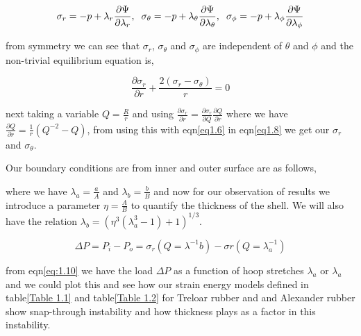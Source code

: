 \documentclass[12pt]{report}
\begin{document}
\begin{flushleft}
\begin{equation}\label{eq1.7}
    \sigma_{r} = -p + \lambda_{r}\frac{\partial\Psi}{\partial\lambda_{r}},\hspace{2mm}\sigma_{\theta} = -p + \lambda_{\theta}\frac{\partial\Psi}{\partial\lambda_{\theta}},\hspace{2mm}\sigma_{\phi} = -p + \lambda_{\phi}\frac{\partial\Psi}{\partial\lambda_{\phi}}
\end{equation}

from symmetry we can see that $\sigma_{r}$, $\sigma_{\theta}$ and $\sigma_{\phi}$ are independent of $\theta$ and $\phi$ and the non-trivial equilibrium equation is,
\vspace{-4mm}

\begin{equation}\label{eq1.8}
    \frac{\partial\sigma_{r}}{\partial r} +\frac{2(\sigma_{r}-\sigma_{\theta})}{r} = 0
\end{equation}

next taking a variable $Q=\frac{R}{r}$ and using $\frac{\partial\sigma_{r}}{\partial r}=\frac{\partial\sigma_{r}}{\partial Q}\frac{\partial Q}{\partial r}$ where we have $\frac{\partial Q}{\partial r} = \frac{1}{r}(Q^{-2}-Q)$, from using this with eqn\ref{eq1.6} in eqn\ref{eq1.8} we get our $\sigma_{r}$ and $\sigma_{\theta}$.

Our boundary conditions are from inner and outer surface are as follows,
\vspace{-4mm}
\begin{equation}\label{eq1.9}
\end{equation}

where we have $\lambda_{a} = \frac{a}{A}$ and $\lambda_{b} = \frac{b}{B}$ and now for our observation of results we introduce a parameter $\eta = \frac{A}{B}$ to quantify the thickness of the shell. We will also have the relation $\lambda_{b} = (\eta^{3}(\lambda_{a}^{3}-1) + 1)^{1/3}$.
\vspace{-4mm}

\begin{equation}\label{eq:1.10}
    \Delta P = P_{i} - P_{o} = \sigma_{r}(Q=\lambda^{-1}{b})-\sigma{r}(Q=\lambda^{-1}_{a})
\end{equation}

from eqn\ref{eq:1.10} we have the load $\Delta P$ as a function of hoop stretches $\lambda_{a}$ or $\lambda_{a}$ and we could plot this and see how our strain energy models defined in table\ref{Table 1.1} and table\ref{Table 1.2} for Treloar\cite{treloar} rubber and and Alexander\cite{alexander} rubber show snap-through instability and how thickness plays as a factor in this instability.

\end{flushleft}
\end{document}
